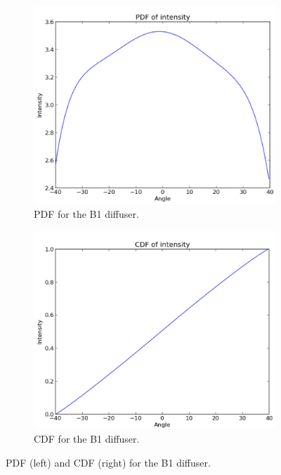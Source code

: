 \begin{figure}
    \centering
    
    \begin{subfigure}{0.5\textwidth}
        \centering
        \includegraphics[width=\textwidth]{Figures/B1_diff_pdf.png} %
        \caption{PDF for the B1 diffuser.}
    \end{subfigure}\hfill
    \begin{subfigure}{0.5\textwidth}
        \centering
        \includegraphics[width=\textwidth]{Figures/B1_diff_cdf.PNG} %
        \caption{CDF for the B1 diffuser.}
    \end{subfigure}
    \caption{PDF (left) and CDF (right) for the B1 diffuser.}
    \label{fig:PDF_CDF_diff_B1}
\end{figure}


